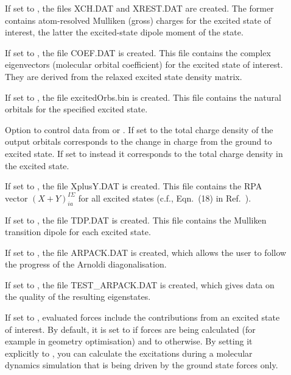 \begin{description}
  \item[] If set to , the files XCH.DAT and XREST.DAT are created. The
    former contains atom-resolved Mulliken (gross) charges for the excited state of interest, the
    latter the excited-state dipole moment of the state.

  \item[] If set to , the file COEF.DAT is created. This file contains
    the complex eigenvectors (molecular orbital coefficient) for the excited state of interest. They
    are derived from the relaxed excited state density matrix.

  \item[] If set to , the file excitedOrbs.bin is created. This file
    contains the natural orbitals for the specified excited state.

  \item[] Option to control data from
     or . If set to  the
    total charge density of the output orbitals corresponds to the change in
    charge from the ground to excited state. If set to  instead it
    corresponds to the total charge density in the excited state.

  \item[] If set to , the file XplusY.DAT is created. This file contains the
    RPA vector $(X+Y)^{I\Sigma}_{ia}$ for all excited states (c.f., Eqn.~(18) in
    Ref.~\cite{heringer2007aes}).

  \item[] If set to , the file TDP.DAT is created. This file
    contains the Mulliken transition dipole for each excited state.

  \item[] If set to , the file ARPACK.DAT is created, which allows
    the user to follow the progress of the Arnoldi diagonalisation.

  \item[] If set to , the file TEST\_ARPACK.DAT is created, which gives data
    on the quality of the resulting eigenstates.

  \item[] If set to , evaluated forces include
    the contributions from an excited state of interest. By default, it is set
    to  if forces are being calculated (for example in geometry
    optimisation) and to  otherwise. By setting it explicitly to
    , you can calculate the excitations during a molecular dynamics
    simulation that is being driven by the ground state forces only.


\end{description}
